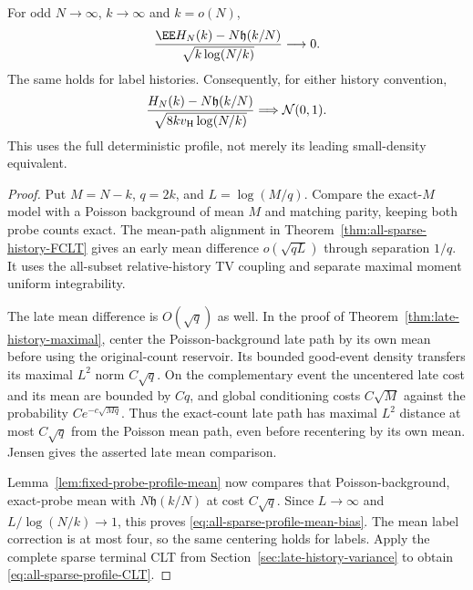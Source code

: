 \documentclass[11pt,letterpaper]{article}
\begin{document}
\begin{theorem}
\label{thm:all-sparse-profile-centering}
For odd $N\to\infty$, $k\to\infty$ and $k=o(N)$,
\begin{equation}\label{eq:all-sparse-profile-mean-bias}
 \frac{\EE H_N(k)-N\mathfrak h(k/N)}
                         {\sqrt{k\log(N/k)}}\longrightarrow0.
\end{equation}
The same holds for label histories. Consequently, for either
history convention,
\begin{equation}\label{eq:all-sparse-profile-CLT}
 \frac{H_N(k)-N\mathfrak h(k/N)}
                    {\sqrt{8kv_{\rm H}\log(N/k)}}
                            \Longrightarrow\mathcal N(0,1).
\end{equation}
This uses the full deterministic profile, not merely its
leading small-density equivalent.
\end{theorem}
\begin{proof}
Put $M=N-k$, $q=2k$, and $L=\log(M/q)$.
Compare the exact-$M$ model with a Poisson background of
mean $M$ and matching parity, keeping both probe counts exact.
The mean-path alignment in
Theorem~\ref{thm:all-sparse-history-FCLT} gives an early
mean difference $o(\sqrt{qL})$ through separation $1/q$.
It uses the all-subset relative-history TV coupling and
separate maximal moment uniform integrability.

The late mean difference is $O(\sqrt q)$ as well.
In the proof of
Theorem~\ref{thm:late-history-maximal}, center the
Poisson-background late path by its own mean before using
the original-count reservoir.
Its bounded good-event density transfers its maximal
$L^2$ norm $C\sqrt q$. On the complementary event the
uncentered late cost and its mean are bounded by $Cq$,
and global conditioning costs $C\sqrt M$ against the
probability $Ce^{-c\sqrt{Mq}}$.
Thus the exact-count late path has maximal $L^2$ distance
at most $C\sqrt q$ from the Poisson mean path, even before
recentering by its own mean.
Jensen gives the asserted late mean comparison.

Lemma~\ref{lem:fixed-probe-profile-mean} now compares that
Poisson-background, exact-probe mean with
$N\mathfrak h(k/N)$ at cost $C\sqrt q$.
Since $L\to\infty$ and $L/\log(N/k)\to1$, this proves
\eqref{eq:all-sparse-profile-mean-bias}.
The mean label correction is at most four, so the same
centering holds for labels.
Apply the complete sparse terminal CLT from
Section~\ref{sec:late-history-variance} to obtain
\eqref{eq:all-sparse-profile-CLT}.
\end{proof}
\end{document}
